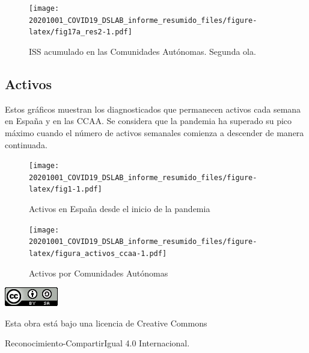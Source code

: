 \documentclass[
  11pt,
]{article}
\begin{document}
\vspace{0.2cm}

\begin{figure}
\centering
\texttt{[image: 20201001\_COVID19\_DSLAB\_informe\_resumido\_files/figure-latex/fig17a\_res2-1.pdf]}
\caption{\label{fig:fig17a_res} ISS acumulado en las Comunidades
Autónomas. Segunda ola.}
\end{figure}

\clearpage

\hypertarget{activos}{%
\subsection{Activos}\label{activos}}

Estos gráficos muestran los diagnosticados que permanecen activos cada
semana en España y en las CCAA. Se considera que la pandemia ha superado
su pico máximo cuando el número de activos semanales comienza a
descender de manera continuada.

\vspace{0.2cm}

\begin{figure}
\centering
\texttt{[image: 20201001\_COVID19\_DSLAB\_informe\_resumido\_files/figure-latex/fig1-1.pdf]}
\caption{\label{fig:fig17a_res} Activos en España desde el inicio de la
pandemia}
\end{figure}

\begin{figure}
\centering
\texttt{[image: 20201001\_COVID19\_DSLAB\_informe\_resumido\_files/figure-latex/figura\_activos\_ccaa-1.pdf]}
\caption{\label{fig:figura_activos_ccaa} Activos por Comunidades
Autónomas}
\end{figure}

\begin{center}
\includegraphics{cc.png}
\end{center}

\vspace{0.2cm}

\begin{center}
Esta obra está bajo una licencia de Creative Commons 
\end{center}

\begin{center}
Reconocimiento-CompartirIgual 4.0 Internacional.
\end{center}
\end{document}
